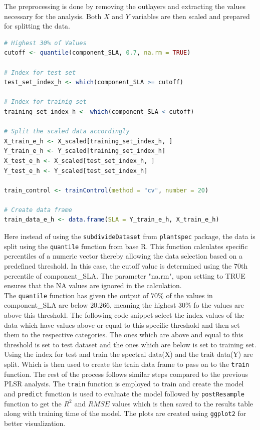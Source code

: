 \documentclass[12pt,a4paper]{report}
\begin{document}
The preprocessing is done by removing the outlayers and extracting the values necessary for the analysis. Both $X$ and $Y$ variables are then scaled and prepared for splitting the data. \\

\begin{lstlisting}[language=R, style=mystyle]
# Highest 30% of Values
cutoff <- quantile(component_SLA, 0.7, na.rm = TRUE)

# Index for test set
test_set_index_h <- which(component_SLA >= cutoff)

# Index for trainig set
training_set_index_h <- which(component_SLA < cutoff)

# Split the scaled data accordingly
X_train_e_h <- X_scaled[training_set_index_h, ]
Y_train_e_h <- Y_scaled[training_set_index_h]
X_test_e_h <- X_scaled[test_set_index_h, ]
Y_test_e_h <- Y_scaled[test_set_index_h]

train_control <- trainControl(method = "cv", number = 20)

# Create data frame 
train_data_e_h <- data.frame(SLA = Y_train_e_h, X_train_e_h)
\end{lstlisting}

 Here instead of using the \texttt{subdivideDataset} from \texttt{plantspec} package, the data is split using the \texttt{quantile} function from base R. This function calculates specific percentiles of a numeric vector thereby allowing the data selection based on a predefined threshold. In this case, the cutoff value is determined using the $70$th percentile of component\_SLA. The parameter "na.rm", upon setting to TRUE ensures that the NA values are ignored in the calculation.\\

 The \texttt{quantile} function has given the output of $70\%$ of the values in component\_SLA are below $20.266$, meaning the highest $30\%$ fo the values are above this threshold. The following code snippet select the index values of the data which have values above or equal to this specific threshold and then set them to the respective categories. The ones which are above and equal to this threshold is set to test dataset and the ones which are below is set to training set. \\

Using the index for test and train the spectral data(X) and the trait data(Y) are split. Which is then used to create the train data frame to pass on to the \texttt{train} function. The rest of the process follows similar steps compared to the previous PLSR analysis. The \texttt{train} function is employed to train and create the model and \texttt{predict} function is used to evaluate the model followed by \texttt{postResample} function to get the $R^2$ and $RMSE$ values which is then saved to the results table along with training time of the model. The plots are created using \texttt{ggplot2} for better visualization.
\end{document}

